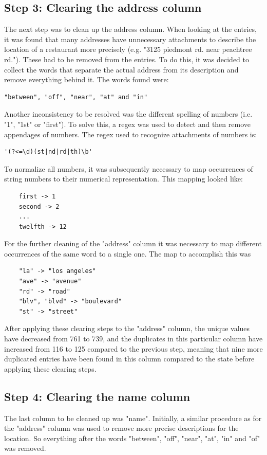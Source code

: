 \documentclass[conference]{IEEEtran}
\begin{document}
\subsection{Step 3: Clearing the address column}
The next step was to clean up the address column. When looking at the entries, it was found that many addresses have unnecessary attachments to describe the location of a restaurant more precisely (e.g. "3125 piedmont rd. near peachtree rd."). These had to be removed from the entries. To do this, it was decided to collect the words that separate the actual address from its description and remove everything behind it. The words found were: 
\begin{lstlisting}
"between", "off", "near", "at" and "in"
\end{lstlisting}
Another inconsistency to be resolved was the different spelling of numbers (i.e. "1", "1st" or "first"). To solve this, a regex was used to detect and then remove appendages of numbers. The regex used to recognize attachments of numbers is: 
\begin{lstlisting}
'(?<=\d)(st|nd|rd|th)\b'
\end{lstlisting}
To normalize all numbers, it was subsequently necessary to map occurrences of string numbers to their numerical representation. This mapping looked like: 
\begin{lstlisting}
	first -> 1
	second -> 2
	...
	twelfth -> 12
\end{lstlisting} 
For the further cleaning of the "address" column it was necessary to map different occurrences of the same word to a single one. The map to accomplish this was 
\begin{lstlisting}
	"la" -> "los angeles" 
	"ave" -> "avenue"
	"rd" -> "road"
	"blv", "blvd" -> "boulevard" 
	"st" -> "street"
\end{lstlisting} 
After applying these clearing steps to the "address" column, the unique values have decreased from 761 to 739, and the duplicates in this particular column have increased from 116 to 125 compared to the previous step, meaning that nine more duplicated entries have been found in this column compared to the state before applying these clearing steps.
\subsection{Step 4: Clearing the name column}
The last column to be cleaned up was "name". Initially, a similar procedure as for the "address" column was used to remove more precise descriptions for the location. So everything after the words "between", "off", "near", "at", "in" and "of" was removed.
\end{document}
